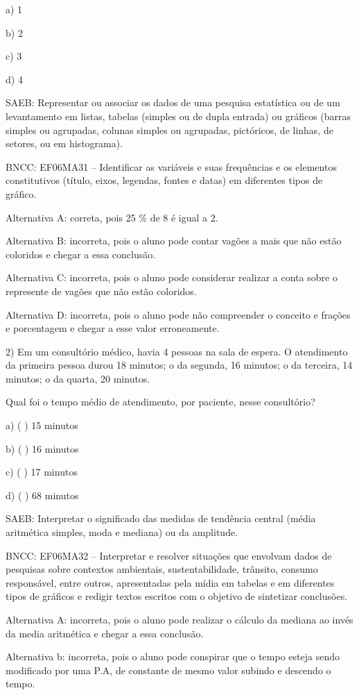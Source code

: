 a) 1

b) 2

c) 3

d) 4

SAEB: Representar ou associar os dados de uma pesquisa estatística ou de
um levantamento em listas, tabelas (simples ou de dupla entrada) ou
gráficos (barras simples ou agrupadas, colunas simples ou agrupadas,
pictóricos, de linhas, de setores, ou em histograma).

BNCC: EF06MA31 -- Identificar as variáveis e suas frequências e os
elementos constitutivos (título, eixos, legendas, fontes e datas) em
diferentes tipos de gráfico.

Alternativa A: correta, pois 25 \% de 8 é igual a 2.

Alternativa B: incorreta, pois o aluno pode contar vagões a mais que não
estão coloridos e chegar a essa conclusão.

Alternativa C: incorreta, pois o aluno pode considerar realizar a conta
sobre o represente de vagões que não estão coloridos.

Alternativa D: incorreta, pois o aluno pode não compreender o conceito e
frações e porcentagem e chegar a esse valor erroneamente.

2) Em um consultório médico, havia 4 pessoas na sala de espera. O
atendimento da primeira pessoa durou 18 minutos; o da segunda, 16
minutos; o da terceira, 14 minutos; o da quarta, 20 minutos.

Qual foi o tempo médio de atendimento, por paciente, nesse consultório?

a) ( ) 15 minutos

b) ( ) 16 minutos

c) ( ) 17 minutos

d) ( ) 68 minutos

SAEB: Interpretar o significado das medidas de tendência central (média
aritmética simples, moda e mediana) ou da amplitude.

BNCC: EF06MA32 -- Interpretar e resolver situações que envolvam dados de
pesquisas sobre contextos ambientais, sustentabilidade, trânsito,
consumo responsável, entre outros, apresentadas pela mídia em tabelas e
em diferentes tipos de gráficos e redigir textos escritos com o objetivo
de sintetizar conclusões.

Alternativa A: incorreta, pois o aluno pode realizar o cálculo da
mediana ao invés da media aritmética e chegar a essa conclusão.

Alternativa b: incorreta, pois o aluno pode conspirar que o tempo esteja
sendo modificado por uma P.A, de constante de mesmo valor subindo e
descendo o tempo.

